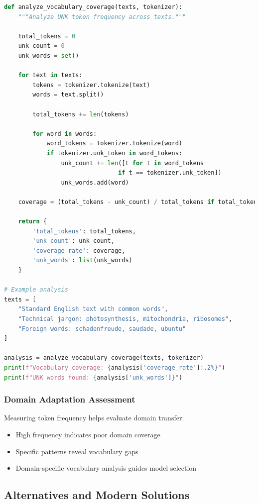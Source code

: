 \begin{lstlisting}[language=Python]
def analyze_vocabulary_coverage(texts, tokenizer):
    """Analyze UNK token frequency across texts."""
    
    total_tokens = 0
    unk_count = 0
    unk_words = set()
    
    for text in texts:
        tokens = tokenizer.tokenize(text)
        words = text.split()
        
        total_tokens += len(tokens)
        
        for word in words:
            word_tokens = tokenizer.tokenize(word)
            if tokenizer.unk_token in word_tokens:
                unk_count += len([t for t in word_tokens 
                                if t == tokenizer.unk_token])
                unk_words.add(word)
    
    coverage = (total_tokens - unk_count) / total_tokens if total_tokens > 0 else 0
    
    return {
        'total_tokens': total_tokens,
        'unk_count': unk_count,
        'coverage_rate': coverage,
        'unk_words': list(unk_words)
    }

# Example analysis
texts = [
    "Standard English text with common words",
    "Technical jargon: photosynthesis, mitochondria, ribosomes",
    "Foreign words: schadenfreude, saudade, ubuntu"
]

analysis = analyze_vocabulary_coverage(texts, tokenizer)
print(f"Vocabulary coverage: {analysis['coverage_rate']:.2%}")
print(f"UNK words found: {analysis['unk_words']}")
\end{lstlisting}

\subsubsection{Domain Adaptation Assessment}
Measuring \unk{} token frequency helps evaluate domain transfer:

\begin{itemize}
\item High \unk{} frequency indicates poor domain coverage
\item Specific \unk{} patterns reveal vocabulary gaps
\item Domain-specific vocabulary analysis guides model selection
\end{itemize}

\subsection{Alternatives and Modern Solutions}

